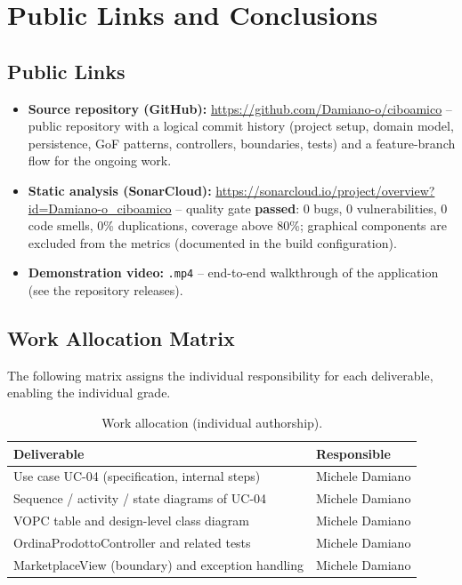 \chapter{Public Links and Conclusions}\label{ch:links}

\section{Public Links}

\sloppy
\begin{itemize}
    \item \textbf{Source repository (GitHub):}
    \url{https://github.com/Damiano-o/ciboamico} -- public repository with a
    logical commit history (project setup, domain model, persistence, GoF
    patterns, controllers, boundaries, tests) and a feature-branch flow for
    the ongoing work.
    \item \textbf{Static analysis (SonarCloud):}
    \url{https://sonarcloud.io/project/overview?id=Damiano-o_ciboamico} --
    quality gate \textbf{passed}: 0 bugs, 0 vulnerabilities, 0 code smells,
    0\% duplications, coverage above 80\%; graphical components are excluded
    from the metrics (documented in the build configuration).
    \item \textbf{Demonstration video:} \texttt{.mp4} -- end-to-end walkthrough
    of the application (see the repository releases).
\end{itemize}
\fussy

\section{Work Allocation Matrix}
The following matrix assigns the individual responsibility for each
deliverable, enabling the individual grade.

\begin{table}[H]
\centering
\caption{Work allocation (individual authorship).}
\label{tab:work}
\begin{tabular}{@{}ll@{}}
\toprule
\textbf{Deliverable} & \textbf{Responsible} \\
\midrule
Use case UC-04 (specification, internal steps) & Michele Damiano \\
Sequence / activity / state diagrams of UC-04 & Michele Damiano \\
VOPC table and design-level class diagram & Michele Damiano \\
OrdinaProdottoController and related tests & Michele Damiano \\
MarketplaceView (boundary) and exception handling & Michele Damiano \\
\bottomrule
\end{tabular}
\end{table}

